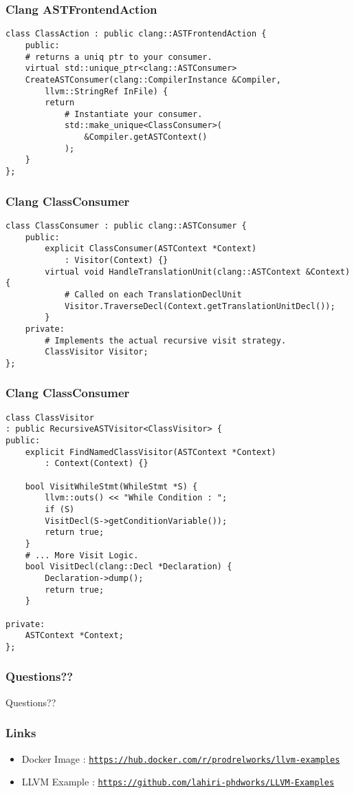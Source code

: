 \documentclass{beamer}
\begin{document}
\begin{frame}[fragile]
	\frametitle{Clang ASTFrontendAction}
		\begin{verbatim}
class ClassAction : public clang::ASTFrontendAction {
	public:
	# returns a uniq ptr to your consumer.
	virtual std::unique_ptr<clang::ASTConsumer>
	CreateASTConsumer(clang::CompilerInstance &Compiler, 
		llvm::StringRef InFile) {
		return 
			# Instantiate your consumer. 
			std::make_unique<ClassConsumer>(
				&Compiler.getASTContext()
			);
	}
};
	\end{verbatim}
\end{frame}

\begin{frame}[fragile]
	\frametitle{Clang ClassConsumer}
	\begin{verbatim}
class ClassConsumer : public clang::ASTConsumer {
	public:
		explicit ClassConsumer(ASTContext *Context) 
			: Visitor(Context) {}
		virtual void HandleTranslationUnit(clang::ASTContext &Context) {
			# Called on each TranslationDeclUnit
			Visitor.TraverseDecl(Context.getTranslationUnitDecl());
		}
	private:
		# Implements the actual recursive visit strategy.
		ClassVisitor Visitor;
};
	\end{verbatim}
\end{frame}

\begin{frame}[fragile]
	\frametitle{Clang ClassConsumer}
	\begin{verbatim}
class ClassVisitor
: public RecursiveASTVisitor<ClassVisitor> {
public:
	explicit FindNamedClassVisitor(ASTContext *Context) 
		: Context(Context) {}
	
	bool VisitWhileStmt(WhileStmt *S) {
		llvm::outs() << "While Condition : ";
		if (S)
		VisitDecl(S->getConditionVariable());
		return true;
	}
	# ... More Visit Logic. 
	bool VisitDecl(clang::Decl *Declaration) {
		Declaration->dump();
		return true;
	}

private:
	ASTContext *Context;
};
	\end{verbatim}
\end{frame}

\begin{frame}
	\frametitle{Questions??}
	Questions??
\end{frame}

\begin{frame}
	\frametitle{Links}
	\begin{itemize}
		\item Docker Image : \texttt{\href{https://hub.docker.com/r/prodrelworks/llvm-examples}{https://hub.docker.com/r/prodrelworks/llvm-examples}}
		\item LLVM Example : \texttt{\href{https://github.com/lahiri-phdworks/LLVM-Examples}{https://github.com/lahiri-phdworks/LLVM-Examples}}
	\end{itemize}
\end{frame}
\end{document}
